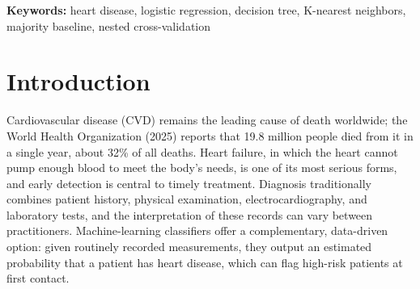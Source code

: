 \documentclass[12pt,a4paper]{article}
\begin{document}
\setcounter{page}{1}

\begin{abstract}\noindent
Cardiovascular disease is the leading global cause of death, and routine clinical measurements could support early screening if they are turned into reliable risk estimates. This study compares three supervised classifiers---logistic regression, a decision tree, and K-nearest neighbors (KNN)---against a majority-class baseline on the Heart Failure Prediction Dataset (918 patients, 11 predictors, 55.3\% positive). All preprocessing (median imputation, scaling, one-hot encoding) is fitted inside scikit-learn pipelines to prevent leakage; hyperparameters are tuned by 5-fold cross-validation on a stratified 75\% training split; models are compared by nested cross-validation and then evaluated once on a 25\% held-out test set. The baseline, which predicts ``heart disease'' for everyone, reaches 55.2\% accuracy and an F1 of 0.712 but has zero specificity and an MCC of 0, showing that accuracy and F1 alone are misleading even in a mildly imbalanced problem. All three models beat the baseline decisively (McNemar $p<10^{-10}$). Logistic regression ($C=1$) and KNN ($k=21$) performed best and were statistically indistinguishable (test ROC AUC 0.933 and 0.939; accuracy 0.887 and 0.883), while the depth-5 decision tree was weaker (AUC 0.908; accuracy 0.843) but the most interpretable. Under an assumed 5:1 false-negative-to-false-positive cost, an out-of-fold threshold cut expected cost from 74--120 to 54--69 units, below the baseline's 103. We recommend logistic regression as the default screening model because it matches KNN's accuracy, is transparent, and needs no stored training set. Because the data pool five hospitals and the test set has only 230 patients, any deployment would first require local validation.
\end{abstract}

\noindent\textbf{Keywords:} heart disease, logistic regression, decision tree, K-nearest neighbors, majority baseline, nested cross-validation

\newpage
\tableofcontents
\newpage

\setcounter{page}{1}

\section{Introduction}
Cardiovascular disease (CVD) remains the leading cause of death worldwide; the World Health Organization (2025) reports that 19.8 million people died from it in a single year, about 32\% of all deaths. Heart failure, in which the heart cannot pump enough blood to meet the body's needs, is one of its most serious forms, and early detection is central to timely treatment. Diagnosis traditionally combines patient history, physical examination, electrocardiography, and laboratory tests, and the interpretation of these records can vary between practitioners. Machine-learning classifiers offer a complementary, data-driven option: given routinely recorded measurements, they output an estimated probability that a patient has heart disease, which can flag high-risk patients at first contact.
\end{document}
